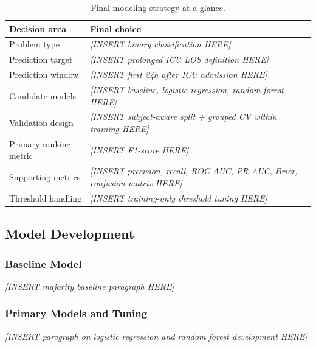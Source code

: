 \documentclass[12pt]{article}
\newcommand{\placeholder}[1]{\textit{[INSERT #1 HERE]}}
\begin{document}
\begin{table}[H]
\centering
\small
\caption{Final modeling strategy at a glance.}
\label{tab:modeling_strategy}
\begin{tabular}{@{}L{3.4cm}L{8.9cm}@{}}
\toprule
\textbf{Decision area} & \textbf{Final choice} \\
\midrule
Problem type & \placeholder{binary classification} \\
Prediction target & \placeholder{prolonged ICU LOS definition} \\
Prediction window & \placeholder{first 24h after ICU admission} \\
Candidate models & \placeholder{baseline, logistic regression, random forest} \\
Validation design & \placeholder{subject-aware split + grouped CV within training} \\
Primary ranking metric & \placeholder{F1-score} \\
Supporting metrics & \placeholder{precision, recall, ROC-AUC, PR-AUC, Brier, confusion matrix} \\
Threshold handling & \placeholder{training-only threshold tuning} \\
\bottomrule
\end{tabular}
\end{table}

\subsection{Model Development}
\label{subsec:model_development}

%
%

\subsubsection*{Baseline Model}
\placeholder{majority baseline paragraph}

\subsubsection*{Primary Models and Tuning}
\placeholder{paragraph on logistic regression and random forest development}
\end{document}
